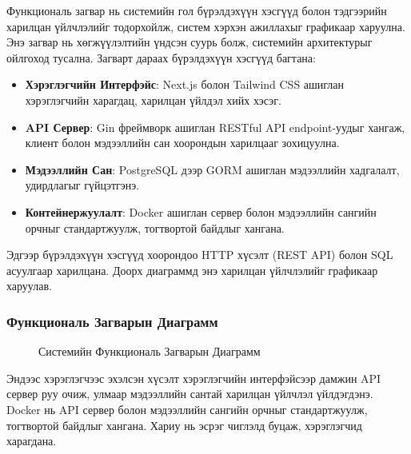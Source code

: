 
Функциональ загвар нь системийн гол бүрэлдэхүүн хэсгүүд болон тэдгээрийн харилцан үйлчлэлийг тодорхойлж, систем хэрхэн ажиллахыг графикаар харуулна. Энэ загвар нь хөгжүүлэлтийн үндсэн суурь болж, системийн архитектурыг ойлгоход тусална. Загварт дараах бүрэлдэхүүн хэсгүүд багтана:
\begin{itemize}
    \item \textbf{Хэрэглэгчийн Интерфэйс}: Next.js болон Tailwind CSS ашиглан хэрэглэгчийн харагдац, харилцан үйлдэл хийх хэсэг.
    \item \textbf{API Сервер}: Gin фреймворк ашиглан RESTful API endpoint-уудыг хангаж, клиент болон мэдээллийн сан хоорондын харилцааг зохицуулна.
    \item \textbf{Мэдээллийн Сан}: PostgreSQL дээр GORM ашиглан мэдээллийн хадгалалт, удирдлагыг гүйцэтгэнэ.
    \item \textbf{Контейнержуулалт}: Docker ашиглан сервер болон мэдээллийн сангийн орчныг стандартжуулж, тогтвортой байдлыг хангана.
\end{itemize}
Эдгээр бүрэлдэхүүн хэсгүүд хоорондоо HTTP хүсэлт (REST API) болон SQL асуулгаар харилцана. Доорх диаграммд энэ харилцан үйлчлэлийг графикаар харуулав.

\subsubsection{Функциональ Загварын Диаграмм}
\begin{figure}[h]
\centering

\caption{Системийн Функциональ Загварын Диаграмм}
\label{fig:functional_model}
\end{figure}

Эндээс хэрэглэгчээс эхэлсэн хүсэлт хэрэглэгчийн интерфэйсээр дамжин API сервер руу очиж, улмаар мэдээллийн сантай харилцан үйлчлэл үйлдэгдэнэ. Docker нь API сервер болон мэдээллийн сангийн орчныг стандартжуулж, тогтвортой байдлыг хангана. Хариу нь эсрэг чиглэлд буцаж, хэрэглэгчид харагдана.
